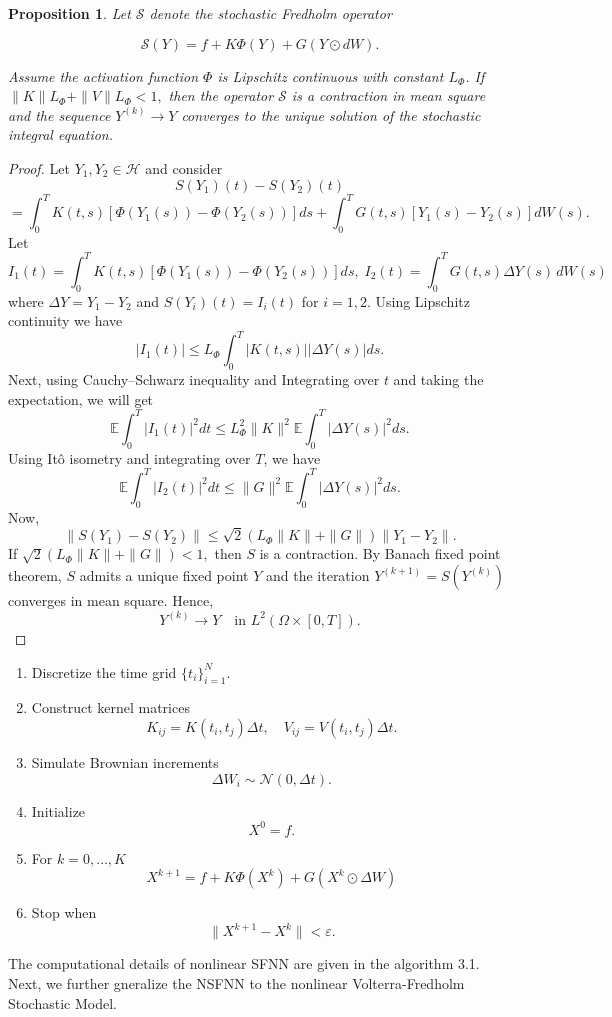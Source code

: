 \documentclass[preprint,12pt,authoryear]{elsarticle}
\newtheorem{proposition}{Proposition}
\begin{document}
\begin{proposition}
Let $\mathcal{S}$ denote the stochastic Fredholm operator

\begin{equation}
\mathcal{S}(Y)=f + K\Phi(Y) + G(Y\odot dW).
\end{equation}

Assume the activation function $\Phi$ is Lipschitz continuous with constant $L_\Phi$. If $
\|K\|L_\Phi + \|V\|L_\Phi < 1,$
then the operator $\mathcal{S}$ is a contraction in mean square and the sequence
$
Y^{(k)} \rightarrow Y
$ converges to the unique solution of the stochastic integral equation.
\end{proposition}
\begin{proof}
   Let $Y_1, Y_2 \in \mathcal{H}$ and consider
\[
S(Y_1)(t) - S(Y_2)(t)
\]
\[
= \int_0^T K(t,s)\left[\Phi(Y_1(s)) - \Phi(Y_2(s))\right] ds
+ \int_0^T G(t,s)\left[Y_1(s) - Y_2(s)\right] dW(s).
\] 
Let
\[
I_1(t) = \int_0^T K(t,s)\left[\Phi(Y_1(s)) - \Phi(Y_2(s))\right] ds,\;
I_2(t) = \int_0^T G(t,s)\Delta Y(s)\, dW(s)
\]
where $\Delta Y = Y_1 - Y_2$ and $S(Y_i)(t)=I_i(t)$ for $i=1,2$.
Using Lipschitz continuity we have 
\[
|I_1(t)| \le L_\Phi \int_0^T |K(t,s)| |\Delta Y(s)| ds.
\]
Next, using Cauchy–Schwarz inequality and 
Integrating over $t$ and taking the expectation, we will get
\[
\mathbb{E}\int_0^T |I_1(t)|^2 dt
\le L_\Phi^2 \|K\|^2 \mathbb{E}\int_0^T |\Delta Y(s)|^2 ds.
\]
Using Itô isometry and integrating over $T$, we have
\[
\mathbb{E}\int_0^T |I_2(t)|^2 dt
\le \|G\|^2 \mathbb{E}\int_0^T |\Delta Y(s)|^2 ds.
\]
Now,
\[
\|S(Y_1) - S(Y_2)\|
\le \sqrt{2}\left( L_\Phi \|K\| + \|G\| \right)\|Y_1 - Y_2\|.
\]
If $
\sqrt{2}\left( L_\Phi \|K\| + \|G\| \right) < 1,$
then $S$ is a contraction.
By Banach fixed point theorem, $S$ admits a unique fixed point $Y$
and the iteration $Y^{(k+1)} = S(Y^{(k)})$ converges in mean square. Hence,
\[
Y^{(k)} \to Y \quad \text{in } L^2(\Omega \times [0,T]).
\]
\end{proof}
\begin{algorithm}[H]
\caption{Deep Stochastic Fredholm Neural Network}
\begin{enumerate}
\item Discretize the time grid $\{t_i\}_{i=1}^N$.
\item Construct kernel matrices
\[
K_{ij}=K(t_i,t_j)\Delta t, \quad 
V_{ij}=V(t_i,t_j)\Delta t.
\]
\item Simulate Brownian increments
\[
\Delta W_i \sim \mathcal{N}(0,\Delta t).
\]
\item Initialize
\[
X^0 = f.
\]
\item For $k=0,\dots,K$
\[
X^{k+1} = f + K\Phi(X^k) + G(X^k\odot \Delta W)
\]
\item Stop when
\[
\|X^{k+1}-X^k\| < \varepsilon .
\]
\end{enumerate}
\end{algorithm}
The computational details of nonlinear SFNN are given in the algorithm 3.1. Next, we further gneralize the NSFNN to the nonlinear Volterra-Fredholm Stochastic Model. 
\end{document}
